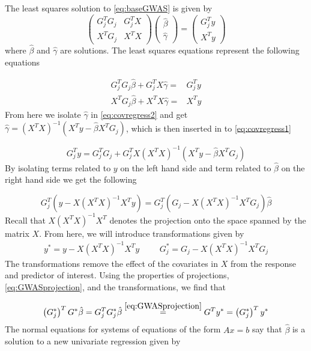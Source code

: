 The least squares solution to \cref{eq:baseGWAS} is given by 
\begin{equation}
\begin{pmatrix}
G_j^T G_j & G_j^T X \\
X^T G_j & X^T X
\end{pmatrix}
\begin{pmatrix}
\hat{\beta} \\
\hat{\gamma}
\end{pmatrix} = 
\begin{pmatrix}
G_j^T y \\
X^T y
\end{pmatrix}
\end{equation}
where $ \hat{\beta} $ and $ \hat{\gamma} $ are solutions. The least squares equations represent the following equations

\begin{align}
G_j^T G_j\hat{\beta} +  G_j^T X \hat{\gamma} =&  G_j^T y  \label{eq:covregress1}\\ 
X^T G_j \hat{\beta} + X^T X \hat{\gamma} =&  X^Ty \label{eq:covregress2}
\end{align}
From here we isolate $ \hat{\gamma} $ in \cref{eq:covregress2} and get $ \hat{\gamma} = (X^TX)^{-1}(X^Ty - \hat{\beta} X^TG_j) $, which is then inserted in to \cref{eq:covregress1} 

\begin{equation}
G^T_j y = G_j^TG_j + G_j^TX (X^TX)^{-1}(X^Ty - \hat{\beta} X^TG_j)
\end{equation}
By isolating terms related to $ y $ on the left hand side and term related to $ \hat{\beta} $ on the right hand side we get the following

\begin{equation} \label{eq:GWASprojection}
G_j^T(y - X(X^TX)^{-1}X^Ty) = G_j^T(G_j - X(X^TX)^{-1}X^TG_j) \hat{\beta}
\end{equation}
Recall that $ X(X^TX)^{-1}X^T $ denotes the projection onto the space spanned by the matrix $ X $. From here, we will introduce transformations given by 
\begin{align}
	y^\ast = y - X(X^TX)^{-1}X^Ty & & & G_j^{\ast} = G_j - X(X^TX)^{-1}X^TG_j
\end{align}
The transformations remove the effect of the covariates in $ X $ from the response and predictor of interest. Using the properties of projections, \cref{eq:GWASprojection}, and the transformations, we find that 

\begin{equation}
\left( G_j^{\ast} \right)^T G^{\ast} \hat{\beta} = G_j^T G_j^{\ast} \hat{\beta} \stackrel{\ref{eq:GWASprojection}}{=} G^T y^{\ast} = \left( G_j^{\ast} \right)^T y^{\ast}
\end{equation}
The normal equations for systems of equations of the form $ Ax=b $ say that $ \hat{\beta} $ is a solution to a new univariate regression given by

